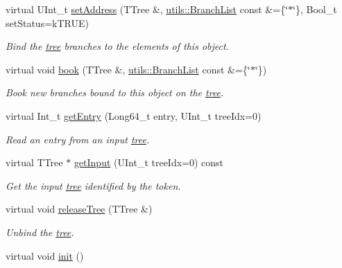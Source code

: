 \begin{DoxyCompactItemize}
virtual UInt\_\-t \hyperlink{classpanda_1_1Object_aed9f9d3b6abe518dd27957de843b36b5}{setAddress} (TTree \&, \hyperlink{classpanda_1_1utils_1_1BranchList}{utils::BranchList} const \&=\{\char`\"{}$\ast$\char`\"{}\}, Bool\_\-t setStatus=kTRUE)
\begin{DoxyCompactList}\small\item\em Bind the \hyperlink{namespacepanda_1_1tree}{tree} branches to the elements of this object. \item\end{DoxyCompactList}\item 
virtual void \hyperlink{classpanda_1_1Object_a2fcd6665633deef16e86aa4e49135dd7}{book} (TTree \&, \hyperlink{classpanda_1_1utils_1_1BranchList}{utils::BranchList} const \&=\{\char`\"{}$\ast$\char`\"{}\})
\begin{DoxyCompactList}\small\item\em Book new branches bound to this object on the \hyperlink{namespacepanda_1_1tree}{tree}. \item\end{DoxyCompactList}\item 
virtual Int\_\-t \hyperlink{classpanda_1_1Object_a08f9b3d452bc056cf3a285dfad15e5ac}{getEntry} (Long64\_\-t entry, UInt\_\-t treeIdx=0)
\begin{DoxyCompactList}\small\item\em Read an entry from an input \hyperlink{namespacepanda_1_1tree}{tree}. \item\end{DoxyCompactList}\item 
virtual TTree $\ast$ \hyperlink{classpanda_1_1Object_a69038e1ce9bc60222bb0ba7e7f933bd5}{getInput} (UInt\_\-t treeIdx=0) const 
\begin{DoxyCompactList}\small\item\em Get the input \hyperlink{namespacepanda_1_1tree}{tree} identified by the token. \item\end{DoxyCompactList}\item 
virtual void \hyperlink{classpanda_1_1Object_aaf58438092b42a89b838ce12c6a23833}{releaseTree} (TTree \&)
\begin{DoxyCompactList}\small\item\em Unbind the \hyperlink{namespacepanda_1_1tree}{tree}. \item\end{DoxyCompactList}\item 
virtual void \hyperlink{classpanda_1_1Object_a204960e5f165a28176f9b4a42b9ea90c}{init} ()

\end{DoxyCompactItemize}
